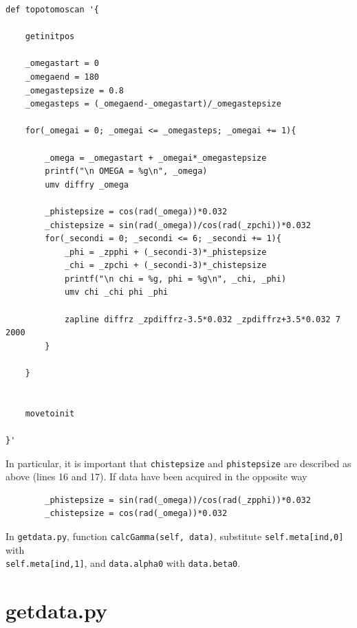 \documentclass[11pt]{scrartcl}
\begin{document}
\begin{lstlisting}
def topotomoscan '{

    getinitpos

    _omegastart = 0
    _omegaend = 180
    _omegastepsize = 0.8
    _omegasteps = (_omegaend-_omegastart)/_omegastepsize

    for(_omegai = 0; _omegai <= _omegasteps; _omegai += 1){

        _omega = _omegastart + _omegai*_omegastepsize
        printf("\n OMEGA = %g\n", _omega)
        umv diffry _omega

        _phistepsize = cos(rad(_omega))*0.032
        _chistepsize = sin(rad(_omega))/cos(rad(_zpchi))*0.032
        for(_secondi = 0; _secondi <= 6; _secondi += 1){
            _phi = _zpphi + (_secondi-3)*_phistepsize
            _chi = _zpchi + (_secondi-3)*_chistepsize
            printf("\n chi = %g, phi = %g\n", _chi, _phi)
            umv chi _chi phi _phi

            zapline diffrz _zpdiffrz-3.5*0.032 _zpdiffrz+3.5*0.032 7 2000
        }

    }


    movetoinit

}'
\end{lstlisting}

In particular, it is important that {\texttt{\textunderscore chistepsize}} and {\texttt{\textunderscore phistepsize}} are described as above (lines 16 and 17). If data have been acquired in the opposite way

\begin{lstlisting}
        _phistepsize = sin(rad(_omega))/cos(rad(_zpphi))*0.032
        _chistepsize = cos(rad(_omega))*0.032
\end{lstlisting}

In {\texttt{getdata.py}}, function {\texttt{calcGamma(self, data)}}, substitute {\texttt{self.meta[ind,0]}} with \\ {\texttt{self.meta[ind,1]}}, and {\texttt{data.alpha0}} with {\texttt{data.beta0}}.

\section{getdata.py}
\label{sec:getdata}
\end{document}
